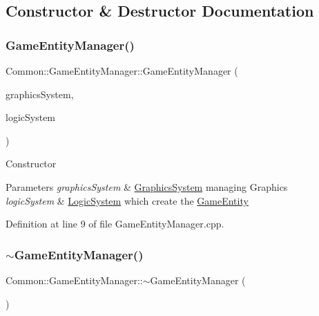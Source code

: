 \subsection{Constructor \& Destructor Documentation}
\mbox{\label{class_common_1_1_game_entity_manager_abd796010d78cf6d9b6b6f8f7eddbba89}} 
\subsubsection{\texorpdfstring{Game\+Entity\+Manager()}{GameEntityManager()}}
{\footnotesize\ttfamily Common\+::\+Game\+Entity\+Manager\+::\+Game\+Entity\+Manager (\begin{DoxyParamCaption}\item[{\hyperlink{class_common_1_1_mq_1_1_message_queue_system}{Mq\+::\+Message\+Queue\+System} $\ast$}]{graphics\+System,  }\item[{\hyperlink{class_common_1_1_logic_system}{Logic\+System} $\ast$}]{logic\+System }\end{DoxyParamCaption})}

Constructor 
\begin{DoxyParams}{Parameters}
{\em graphics\+System} & \hyperlink{class_common_1_1_graphics_system}{Graphics\+System} managing Graphics \\
\hline
{\em logic\+System} & \hyperlink{class_common_1_1_logic_system}{Logic\+System} which create the \hyperlink{struct_common_1_1_game_entity}{Game\+Entity} \\
\hline
\end{DoxyParams}


Definition at line 9 of file Game\+Entity\+Manager.\+cpp.

\mbox{\label{class_common_1_1_game_entity_manager_aed2c3af1b541c879abf7d78f43085e79}} 
\subsubsection{\texorpdfstring{$\sim$\+Game\+Entity\+Manager()}{~GameEntityManager()}}
{\footnotesize\ttfamily Common\+::\+Game\+Entity\+Manager\+::$\sim$\+Game\+Entity\+Manager (\begin{DoxyParamCaption}{ }\end{DoxyParamCaption})}

